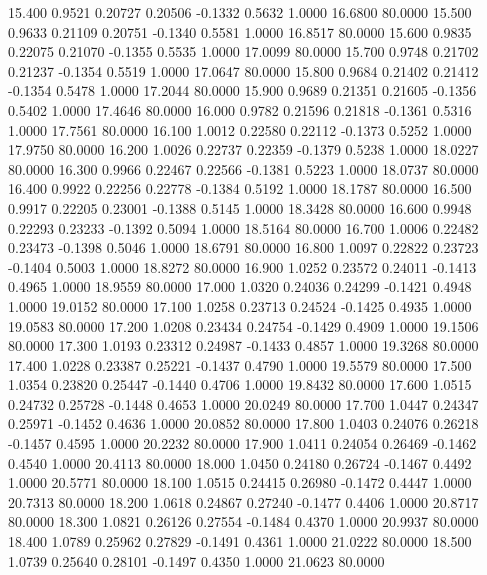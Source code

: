   15.400   0.9521   0.20727   0.20506  -0.1332   0.5632   1.0000  16.6800  80.0000
  15.500   0.9633   0.21109   0.20751  -0.1340   0.5581   1.0000  16.8517  80.0000
  15.600   0.9835   0.22075   0.21070  -0.1355   0.5535   1.0000  17.0099  80.0000
  15.700   0.9748   0.21702   0.21237  -0.1354   0.5519   1.0000  17.0647  80.0000
  15.800   0.9684   0.21402   0.21412  -0.1354   0.5478   1.0000  17.2044  80.0000
  15.900   0.9689   0.21351   0.21605  -0.1356   0.5402   1.0000  17.4646  80.0000
  16.000   0.9782   0.21596   0.21818  -0.1361   0.5316   1.0000  17.7561  80.0000
  16.100   1.0012   0.22580   0.22112  -0.1373   0.5252   1.0000  17.9750  80.0000
  16.200   1.0026   0.22737   0.22359  -0.1379   0.5238   1.0000  18.0227  80.0000
  16.300   0.9966   0.22467   0.22566  -0.1381   0.5223   1.0000  18.0737  80.0000
  16.400   0.9922   0.22256   0.22778  -0.1384   0.5192   1.0000  18.1787  80.0000
  16.500   0.9917   0.22205   0.23001  -0.1388   0.5145   1.0000  18.3428  80.0000
  16.600   0.9948   0.22293   0.23233  -0.1392   0.5094   1.0000  18.5164  80.0000
  16.700   1.0006   0.22482   0.23473  -0.1398   0.5046   1.0000  18.6791  80.0000
  16.800   1.0097   0.22822   0.23723  -0.1404   0.5003   1.0000  18.8272  80.0000
  16.900   1.0252   0.23572   0.24011  -0.1413   0.4965   1.0000  18.9559  80.0000
  17.000   1.0320   0.24036   0.24299  -0.1421   0.4948   1.0000  19.0152  80.0000
  17.100   1.0258   0.23713   0.24524  -0.1425   0.4935   1.0000  19.0583  80.0000
  17.200   1.0208   0.23434   0.24754  -0.1429   0.4909   1.0000  19.1506  80.0000
  17.300   1.0193   0.23312   0.24987  -0.1433   0.4857   1.0000  19.3268  80.0000
  17.400   1.0228   0.23387   0.25221  -0.1437   0.4790   1.0000  19.5579  80.0000
  17.500   1.0354   0.23820   0.25447  -0.1440   0.4706   1.0000  19.8432  80.0000
  17.600   1.0515   0.24732   0.25728  -0.1448   0.4653   1.0000  20.0249  80.0000
  17.700   1.0447   0.24347   0.25971  -0.1452   0.4636   1.0000  20.0852  80.0000
  17.800   1.0403   0.24076   0.26218  -0.1457   0.4595   1.0000  20.2232  80.0000
  17.900   1.0411   0.24054   0.26469  -0.1462   0.4540   1.0000  20.4113  80.0000
  18.000   1.0450   0.24180   0.26724  -0.1467   0.4492   1.0000  20.5771  80.0000
  18.100   1.0515   0.24415   0.26980  -0.1472   0.4447   1.0000  20.7313  80.0000
  18.200   1.0618   0.24867   0.27240  -0.1477   0.4406   1.0000  20.8717  80.0000
  18.300   1.0821   0.26126   0.27554  -0.1484   0.4370   1.0000  20.9937  80.0000
  18.400   1.0789   0.25962   0.27829  -0.1491   0.4361   1.0000  21.0222  80.0000
  18.500   1.0739   0.25640   0.28101  -0.1497   0.4350   1.0000  21.0623  80.0000
